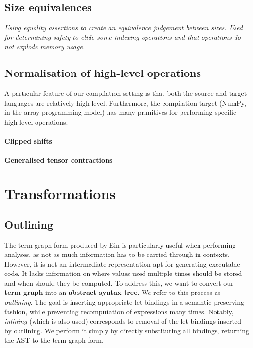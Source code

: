 \subsection{Size equivalences}

\textit{Using equality assertions to create an equivalence judgement between sizes. Used for determining safety to elide some indexing operations and that operations do not explode memory usage.} \todothis 

\subsection{Normalisation of high-level operations}

A particular feature of our compilation setting is that both the source and target languages are relatively high-level. Furthermore, the compilation target (NumPy, in the array programming model) has many primitives for performing specific high-level operations.


\paragraph{Clipped shifts}

\paragraph{Generalised tensor contractions} 

\section{Transformations}
\label{compiler-transformations}

\subsection{Outlining}

The term graph form produced by Ein is particularly useful when performing analyses, as not as much information has to be carried through in contexts. However, it is not an intermediate representation apt for generating executable code. It lacks information on where values used multiple times should be stored and when should they be computed. To address this, we want to convert our \textbf{term graph} into an \textbf{abstract syntax tree}. We refer to this process as \textit{outlining}. The goal is inserting appropriate let bindings in a semantic-preserving fashion, while preventing recomputation of expressions many times. Notably, \textit{inlining} (which is also used) corresponds to removal of the let bindings inserted by outlining. We perform it simply by directly substituting all bindings, returning the AST to the term graph form.

